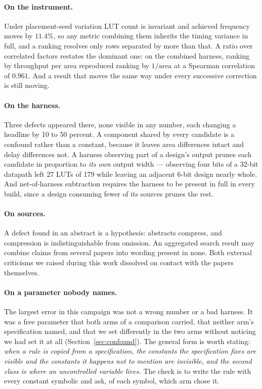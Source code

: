 \documentclass[11pt]{article}
\theoremstyle{definition}
\begin{document}
\paragraph{On the instrument.} Under placement-seed variation LUT count is
invariant and achieved frequency moves by $11.4\%$, so any metric combining them
inherits the timing variance in full, and a ranking resolves only rows separated
by more than that. A ratio over correlated factors restates the dominant one: on
the combined harness, ranking by throughput per area reproduced ranking by
$1/\text{area}$ at a Spearman correlation of $0.961$. And a result that moves the
same way under every successive correction is still moving.

\paragraph{On the harness.} Three defects appeared there, none visible in any
number, each changing a headline by 10 to 50 percent. A component shared by every
candidate is a confound rather than a constant, because it leaves area
differences intact and delay differences not. A harness observing part of a
design's output prunes each candidate in proportion to \emph{its own} output
width --- observing four bits of a 32-bit datapath left 27 LUTs of 179 while
leaving an adjacent 6-bit design nearly whole. And net-of-harness subtraction
requires the harness to be present in full in every build, since a design
consuming fewer of its sources prunes the rest.

\paragraph{On sources.} A defect found in an abstract is a hypothesis: abstracts
compress, and compression is indistinguishable from omission. An aggregated
search result may combine claims from several papers into wording present in
none. Both external criticisms we raised during this work dissolved on contact
with the papers themselves.

\paragraph{On a parameter nobody names.} The largest error in this campaign was
not a wrong number or a bad harness. It was a free parameter that both arms of a
comparison carried, that neither arm's specification named, and that we set
differently in the two arms without noticing we had set it at all
(Section~\ref{sec:confound}). The general form is worth stating: \emph{when a
rule is copied from a specification, the constants the specification fixes are
visible and the constants it happens not to mention are invisible, and the second
class is where an uncontrolled variable lives.} The check is to write the rule
with every constant symbolic and ask, of each symbol, which arm chose it.
\end{document}
